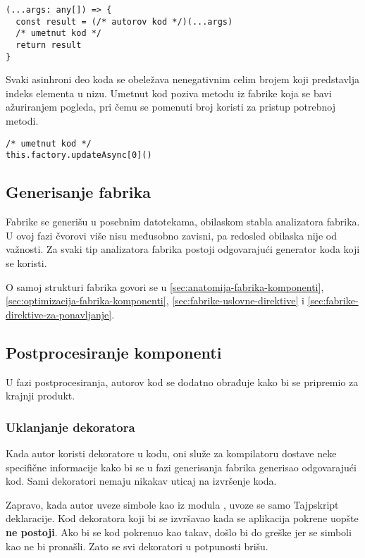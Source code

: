 \begin{lstlisting}
(...args: any[]) => {
  const result = (/* autorov kod */)(...args)
  /* umetnut kod */
  return result
}
\end{lstlisting}

Svaki asinhroni deo koda se obeležava nenegativnim celim brojem koji predstavlja indeks elementa u nizu.
Umetnut kod poziva metodu iz fabrike koja se bavi ažuriranjem pogleda, pri čemu se pomenuti broj koristi za pristup potrebnoj metodi.

\begin{lstlisting}
/* umetnut kod */
this.factory.updateAsync[0]()
\end{lstlisting}

\subsection{Generisanje fabrika}

Fabrike se generišu u posebnim datotekama, obilaskom stabla analizatora fabrika.
U ovoj fazi čvorovi više nisu međusobno zavisni, pa redosled obilaska nije od važnosti.
Za svaki tip analizatora fabrika postoji odgovarajući generator koda koji se koristi.

O samoj strukturi fabrika govori se u \cref{sec:anatomija-fabrika-komponenti}, \cref{sec:optimizacija-fabrika-komponenti}, \cref{sec:fabrike-uslovne-direktive} i \cref{sec:fabrike-direktive-za-ponavljanje}.

\subsection{Postprocesiranje komponenti}

U fazi postprocesiranja, autorov kod se dodatno obrađuje kako bi se pripremio za krajnji produkt.

\subsubsection{Uklanjanje dekoratora}

Kada autor koristi dekoratore u kodu, oni služe za kompilatoru dostave neke specifične informacije kako bi se u fazi generisanja fabrika generisao odgovarajući kod.
Sami dekoratori nemaju nikakav uticaj na izvršenje koda.

Zapravo, kada autor uveze simbole kao  iz modula , uvoze se samo Tajpskript deklaracije.
Kod dekoratora koji bi se izvršavao kada se aplikacija pokrene uopšte \textbf{ne postoji}.
Ako bi se kod pokrenuo kao takav, došlo bi do greške  jer se simboli kao  ne bi pronašli.
Zato se svi dekoratori u potpunosti brišu.

